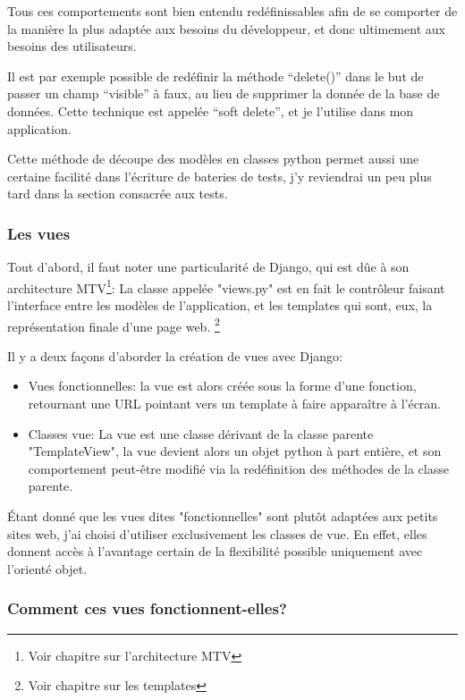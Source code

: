 \documentclass[12pt,table,a4paper]{report}
\begin{document}
Tous ces comportements sont bien entendu redéfinissables afin de se comporter de la manière la plus adaptée aux besoins du développeur, et donc ultimement aux besoins des utilisateurs.

Il est par exemple possible de redéfinir la méthode "`delete()"' dans le but de passer un champ "`visible"' à faux, au lieu de supprimer la donnée de la base de données. Cette technique est appelée "`soft delete"', et je l'utilise dans mon application.

Cette méthode de découpe des modèles en classes python permet aussi une certaine facilité dans l'écriture de bateries de tests, j'y reviendrai un peu plus tard dans la section consacrée aux tests.

\subsubsection{Les vues}
Tout d'abord, il faut noter une particularité de Django, qui est dûe à son architecture MTV\footnote{Voir chapitre sur l'architecture MTV}: La classe appelée "views.py" est en fait le contrôleur faisant l'interface entre les modèles de l'application, et les templates qui sont, eux, la représentation finale d'une page web. \footnote{Voir chapitre sur les templates}

Il y a deux façons d'aborder la création de vues avec Django:

\begin{itemize}
	\item{Vues fonctionnelles: la vue est alors créée sous la forme d'une fonction, retournant une URL pointant vers un template à faire apparaître à l'écran.}
	\item{Classes vue: La vue est une classe dérivant de la classe parente "TemplateView", la vue devient alors un objet python à part entière, et son comportement peut-être modifié via la redéfinition des méthodes de la classe parente.}
\end{itemize}

Étant donné que les vues dites "fonctionnelles" sont plutôt adaptées aux petits sites web, j'ai choisi d'utiliser exclusivement les classes de vue. En effet, elles donnent accès à l'avantage certain de la flexibilité possible uniquement avec l'orienté objet.

\subsubsection{Comment ces vues fonctionnent-elles?}
\end{document}
